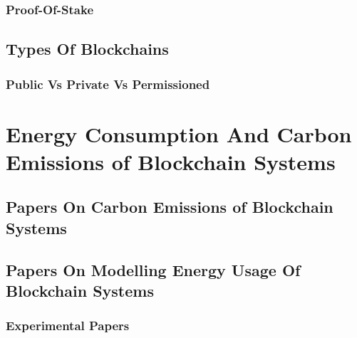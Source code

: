 
\subsubsection{Proof-Of-Stake}






\subsection{Types Of Blockchains}




\subsubsection{Public Vs Private Vs Permissioned}



\section{Energy Consumption And Carbon Emissions of Blockchain Systems}




\subsection{Papers On Carbon Emissions of Blockchain Systems}



\subsection{Papers On Modelling Energy Usage Of Blockchain Systems}



\subsubsection{Experimental Papers}



